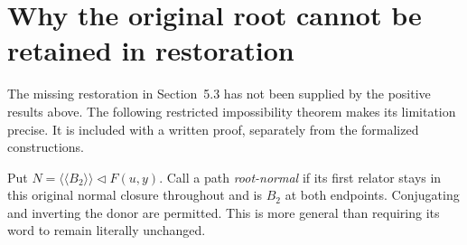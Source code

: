 \documentclass[11pt]{article}
\theoremstyle{definition}\newtheorem{definition}[theorem]{Definition}
\theoremstyle{remark}\newtheorem{remark}[theorem]{Remark}
\newcommand{\ncl}[1]{\langle\!\langle #1\rangle\!\rangle}
\begin{document}
\section{Why the original root cannot be retained in restoration}\label{sec:restriction}
The missing restoration in Section~5.3 has not been supplied by the positive results above. The following restricted impossibility theorem makes its limitation precise. It is included with a written proof, separately from the formalized constructions.

Put $N=\ncl{B_2}\triangleleft F(u,y)$. Call a path \emph{root-normal} if its first relator stays in this original normal closure throughout and is $B_2$ at both endpoints. Conjugating and inverting the donor are permitted. This is more general than requiring its word to remain literally unchanged.
\end{document}
